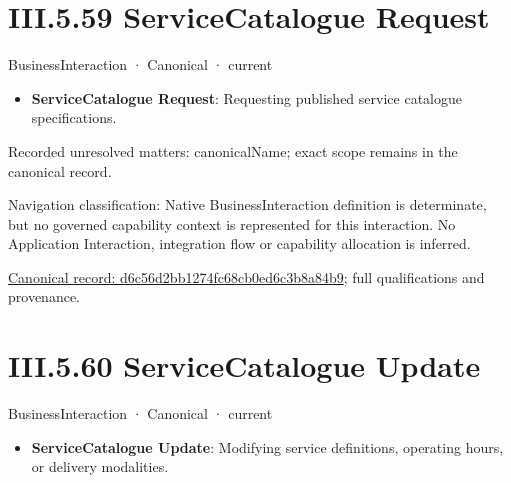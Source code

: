 \section*{III.5.59 ServiceCatalogue Request}
\label{navigation:III.5.59}

\label{element:d6c56d2bb1274fc68cb0ed6c3b8a84b9}
{\small BusinessInteraction · Canonical · current}\par

\begin{itemize}


\item \textbf{ServiceCatalogue Request}: Requesting published service catalogue specifications.

\end{itemize}

{\small Recorded unresolved matters: canonicalName; exact scope remains in the canonical record.}\par
{\small Navigation classification: Native BusinessInteraction definition is determinate, but no governed capability context is represented for this interaction. No Application Interaction, integration flow or capability allocation is inferred.}\par
{\footnotesize \href{../../../../../../../continuum/business/business-interaction/d6c56d2bb1274fc68cb0ed6c3b8a84b9.md}{Canonical record: d6c56d2bb1274fc68cb0ed6c3b8a84b9}; full qualifications and provenance.}\par
\section*{III.5.60 ServiceCatalogue Update}
\label{navigation:III.5.60}

\label{element:c15051a06c1a46b1acb75d18a5e728dd}
{\small BusinessInteraction · Canonical · current}\par

\begin{itemize}


\item \textbf{ServiceCatalogue Update}: Modifying service definitions, operating hours, or delivery modalities.

\end{itemize}

